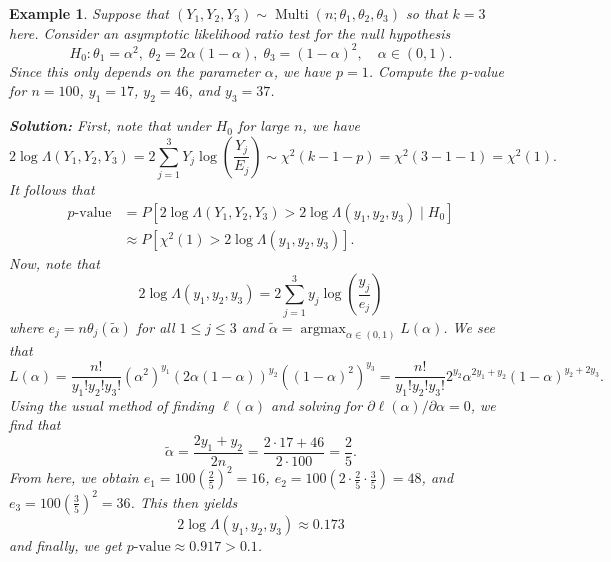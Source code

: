 \documentclass[10pt]{article}
\DeclareMathOperator{\Multi}{Multi}
\DeclareMathOperator{\argmax}{argmax}
\theoremstyle{newstyle}
\newtheorem{exmp}[thm]{Example}
\begin{document}
\begin{exmp}
Suppose that $(Y_1, Y_2, Y_3) \sim \Multi(n; \theta_1, \theta_2, \theta_3)$ so that $k = 3$ here. 
Consider an asymptotic likelihood ratio test for the null hypothesis 
\[ H_0 : \theta_1 = \alpha^2,\; \theta_2 = 2\alpha(1-\alpha),\; \theta_3 = (1-\alpha)^2, \quad 
\alpha \in (0, 1). \]
Since this only depends on the parameter $\alpha$, we have $p = 1$. Compute 
the $p$-value for $n = 100$, $y_1 = 17$, $y_2 = 46$, and $y_3 = 37$. 

{\color{blue}
{\bf Solution:}
First, note that under $H_0$ for large $n$, we have 
\[ 2 \log\Lambda(Y_1, Y_2, Y_3) = 2\sum_{j=1}^3 Y_j \log \left( \frac{Y_j}{E_j} \right) 
\sim \chi^2(k-1-p) = \chi^2(3-1-1) = \chi^2(1). \]
It follows that 
\begin{align*}
    \text{$p$-value} 
    &= P[2\log\Lambda(Y_1,Y_2,Y_3) > 2\log\Lambda(y_1,y_2,y_3) \mid H_0] \\
    &\approx P[\chi^2(1) > 2\log\Lambda(y_1,y_2,y_3)]. 
\end{align*}
Now, note that 
\[ 2\log\Lambda(y_1,y_2,y_3) = 2\sum_{j=1}^3 y_j\log\left(\frac{y_j}{e_j}\right) \]
where $e_j = n\theta_j(\tilde\alpha)$ for all $1 \leq j \leq 3$ and 
$\tilde\alpha = \argmax_{\alpha \in (0, 1)} L(\alpha)$. We see that 
\[ L(\alpha) = 
\frac{n!}{y_1!y_2!y_3!} (\alpha^2)^{y_1} (2\alpha(1-\alpha))^{y_2} ((1-\alpha)^2)^{y_3} 
= \frac{n!}{y_1!y_2!y_3!} 2^{y_2} \alpha^{2y_1+y_2} (1-\alpha)^{y_2+2y_3}. \]
Using the usual method of finding $\ell(\alpha)$ and solving for $\partial\ell(\alpha)/\partial\alpha 
= 0$, we find that 
\[ \tilde\alpha = \frac{2y_1+y_2}{2n} = \frac{2 \cdot 17 + 46}{2 \cdot 100} = \frac25. \] 
From here, we obtain $e_1 = 100 (\frac25)^2 = 16$, $e_2 = 100 (2 \cdot \frac25 \cdot \frac35) = 
48$, and $e_3 = 100 (\frac35)^2 = 36$. This then yields 
\[ 2 \log\Lambda(y_1, y_2, y_3) \approx 0.173 \]
and finally, we get $\text{$p$-value} \approx 0.917 > 0.1$.}
\end{exmp}
\end{document}
